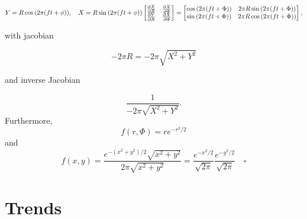 \documentclass[]{book}
\begin{document}
\[
  Y = R\cos{(2\pi(ft + \phi))}, \quad X = R\sin{(2\pi(ft+\phi))}\\
  \begin{bmatrix}
    \frac{\partial X}{\partial R} & \frac{\partial X}{\partial \Phi} \\
    \frac{\partial Y}{\partial R} & \frac{\partial X}{\partial \Phi}
  \end{bmatrix} = 
  \begin{bmatrix}
    \cos{(2\pi(ft + \Phi))} & 2\pi R \sin{(2\pi(ft + \Phi))} \\
    \sin{(2\pi(ft + \Phi))} & 2\pi R \cos{(2\pi(ft + \Phi))}
  \end{bmatrix},
\]

with jacobian

\[
  -2\pi R = -2\pi \sqrt{X^2 + Y^2}
\]

and inverse Jacobian

\[
  \frac{1}{-2\pi \sqrt{X^2 + Y^2}}.
\] Furthermore, \[
  f(r,\Phi) = re^{-r^2/2}
\] and \[ 
  f(x,y) = \frac{e^{-(x^2+y^2)/2}\sqrt{x^2 + y^2}}{2\pi \sqrt{x^2 + y^2}} = \frac{e^{-x^2/2}}{\sqrt{2\pi}}\frac{e^{-y^2/2}}{\sqrt{2\pi}} \quad \square
\]

\chapter{Trends}\label{trends}
\end{document}

